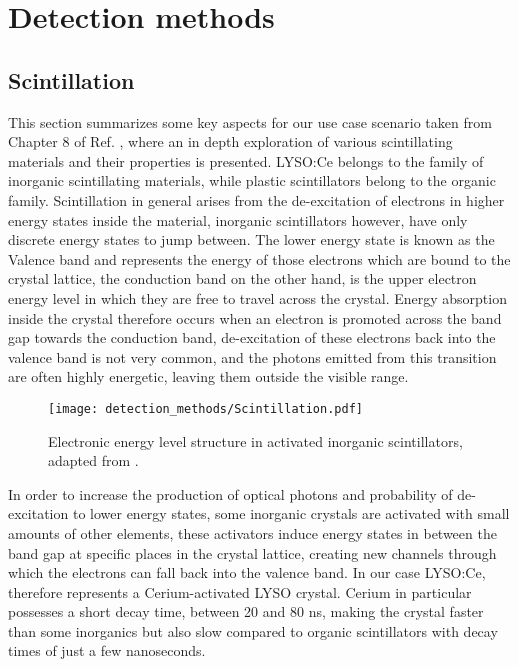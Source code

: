 \chapter{Detection methods} \label{chap:detection_methods}

\section{Scintillation}

This section summarizes some key aspects for our use case scenario taken from Chapter 8 of Ref. \cite{knoll2010radiation}, where an in depth exploration of various scintillating materials and their properties is presented. LYSO:Ce belongs to the family of inorganic scintillating materials, while plastic scintillators belong to the organic family. Scintillation in general arises from the de-excitation of electrons in higher energy states inside the material, inorganic scintillators however, have only discrete energy states to jump between. The lower energy state is known as the Valence band and represents the energy of those electrons which are bound to the crystal lattice, the conduction band on the other hand, is the upper electron energy level in which they are free to travel across the crystal. Energy absorption inside the crystal therefore occurs when an electron is promoted across the band gap towards the conduction band, de-excitation of these electrons back into the valence band is not very common, and the photons emitted from this transition are often highly energetic, leaving them outside the visible range.

\begin{figure}[H]
    \centering
    \texttt{[image: detection\_methods/Scintillation.pdf]}
    \caption{Electronic energy level structure in activated inorganic scintillators, adapted from \cite[Ch.~8]{knoll2010radiation}.}
    \label{fig:Scintillation}
\end{figure}

In order to increase the production of optical photons and probability of de-excitation to lower energy states, some inorganic crystals are activated with small amounts of other elements, these activators induce energy states in between the band gap at specific places in the crystal lattice, creating new channels through which the electrons can fall back into the valence band. In our case LYSO:Ce, therefore represents a Cerium-activated LYSO crystal. Cerium in particular possesses a short decay time, between 20 and 80 ns, making the crystal faster than some inorganics but also slow compared to organic scintillators with decay times of just a few nanoseconds.

